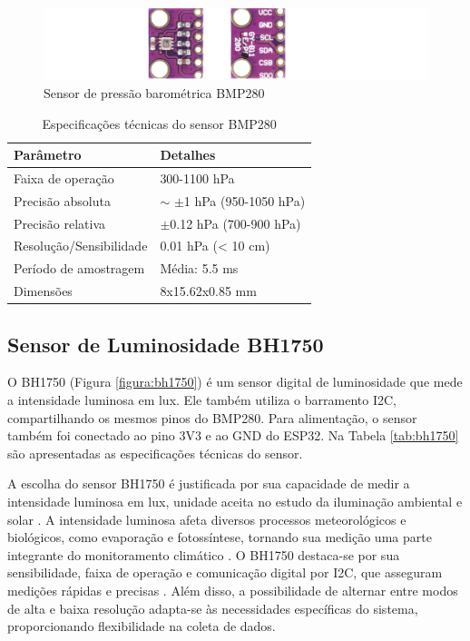 \begin{figure}[!htb] \centering
  \caption{Sensor de pressão barométrica BMP280} \label{figura:bmp280}
  \begin{varwidth}{\linewidth}
    \includegraphics[width=16cm]{figuras/BMP280.png}
  \end{varwidth}
\end{figure}

\begin{table}[!htb]
  \caption{Especificações técnicas do sensor BMP280}
  \begin{tabularx}{\textwidth}{|X|X|} \hline
      \textbf{Parâmetro} & \textbf{Detalhes} \\ \hline
      Faixa de operação & 300-1100 hPa \\ \hline
      Precisão absoluta & $\sim$ $\pm$1 hPa (950-1050 hPa) \\ \hline
      Precisão relativa & $\pm$0.12 hPa (700-900 hPa) \\ \hline
      Resolução/Sensibilidade & 0.01 hPa (< 10 cm) \\ \hline
      Período de amostragem & Média: 5.5 ms \\ \hline
      Dimensões & 8x15.62x0.85 mm \\ \hline
  \end{tabularx}
  \label{tab:bmp280}
\end{table}

\subsection{Sensor de Luminosidade BH1750}

O BH1750 (Figura \ref{figura:bh1750}) é um sensor digital de luminosidade que mede a intensidade luminosa em lux. Ele também utiliza o barramento I2C, compartilhando os mesmos pinos do BMP280. Para alimentação, o sensor também foi conectado ao pino 3V3 e ao GND do ESP32. Na Tabela \ref{tab:bh1750} são apresentadas as especificações técnicas do sensor.

A escolha do sensor BH1750 é justificada por sua capacidade de medir a intensidade luminosa em lux, unidade aceita no estudo da iluminação ambiental e solar \parencite{Prathibha_system2017,Vijh_system2024, Amine_system2024}. A intensidade luminosa afeta diversos processos meteorológicos e biológicos, como evaporação e fotossíntese, tornando sua medição uma parte integrante do monitoramento climático \parencite{Yang_evapotranspiration_med2022}. O BH1750 destaca-se por sua sensibilidade, faixa de operação e comunicação digital por I2C, que asseguram medições rápidas e precisas \parencite{BH1750}. Além disso, a possibilidade de alternar entre modos de alta e baixa resolução adapta-se às necessidades específicas do sistema, proporcionando flexibilidade na coleta de dados.

